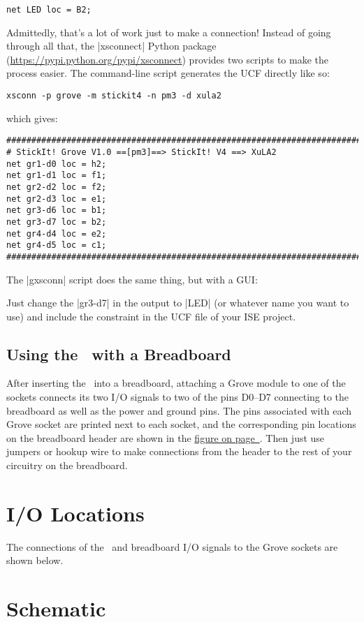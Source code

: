 \documentclass[letterpaper,11pt,oneside]{memoir}
\begin{document}
\begin{lstlisting}
net LED loc = B2;
\end{lstlisting}

Admittedly, that's a lot of work just to make a connection!
Instead of going through all that,
the |xsconnect| Python package (\url{https://pypi.python.org/pypi/xsconnect})
provides two scripts to make the process easier.
The command-line script generates the UCF directly like so:

\begin{lstlisting}
xsconn -p grove -m stickit4 -n pm3 -d xula2
\end{lstlisting}
    
which gives:

\begin{lstlisting}
########################################################################
# StickIt! Grove V1.0 ==[pm3]==> StickIt! V4 ==> XuLA2
net gr1-d0 loc = h2;
net gr1-d1 loc = f1;
net gr2-d2 loc = f2;
net gr2-d3 loc = e1;
net gr3-d6 loc = b1;
net gr3-d7 loc = b2;
net gr4-d4 loc = e2;
net gr4-d5 loc = c1;
########################################################################
\end{lstlisting}

The |gxsconn| script does the same thing, but with a GUI:


Just change the |gr3-d7| in the output to |LED| (or whatever name you want to use) and include
the constraint in the UCF file of your ISE project. 


\section{Using the \product\ with a Breadboard}

After inserting the \product\ into a breadboard, attaching a Grove module to one of the sockets
connects its two I/O signals to two of the pins D0--D7 connecting to the breadboard 
as well as the power and ground pins.
The pins associated with each Grove socket are printed next to each socket, and
the corresponding pin locations on the breadboard header are shown in the 
\hyperref[fig:connections]{figure on page~\pageref*{fig:connections}}.
Then just use jumpers or hookup wire to make connections from the header
to the rest of your circuitry on the breadboard.


\chapter{I/O Locations}

The connections of the \digpmod\ and breadboard I/O signals to the Grove sockets are shown below.


\chapter{Schematic}

\pagebreak
{}
\end{document}
